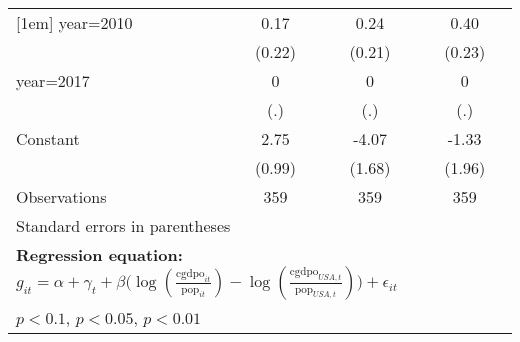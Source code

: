 \begin{sidewaystable}[htbp]
\begin{tabular}{l*{3}{c}}
[1em]
year=2010       &     0.17         &     0.24         &     0.40\sym{*}  \\
                &   (0.22)         &   (0.21)         &   (0.23)         \\
[1em]
year=2017       &        0         &        0         &        0         \\
                &      (.)         &      (.)         &      (.)         \\
[1em]
Constant        &     2.75\sym{***}&    -4.07\sym{**} &    -1.33         \\
                &   (0.99)         &   (1.68)         &   (1.96)         \\
\hline
Observations    &      359         &      359         &      359         \\
\hline\hline
\multicolumn{4}{l}{\footnotesize Standard errors in parentheses}\\
\multicolumn{4}{l}{\footnotesize \textbf{Regression equation:} \(g_{it} = \alpha + \gamma_t + \beta \big(\log (\frac{\textrm{cgdpo}_{it}}{\textrm{pop}_{it}} ) - \log (\frac{\textrm{cgdpo}_{USA,t}}{\textrm{pop}_{USA,t}}  ) \big) + \epsilon_{it}\)}\\
\multicolumn{4}{l}{\footnotesize \sym{*} \(p<0.1\), \sym{**} \(p<0.05\), \sym{***} \(p<0.01\)}\\
\end{tabular}
\end{sidewaystable}
